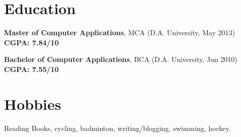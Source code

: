 \documentclass[overlapped,centered]{resume}
\begin{document}
\begin{resume}
    \section{\mysidestyle Education}

    \begin{list2}
	\item \textbf{Master of Computer Applications}, MCA (D.A. University, May 2013) \hspace{16mm} \textbf{CGPA: 7.84/10} 
	\end{list2}

	\begin{list2}
	\item \textbf{Bachelor of Computer Applications}, BCA (D.A. University, Jun 2010) \hspace{15mm} \textbf{CGPA: 7.55/10}
	\end{list2}

    \section{\mysidestyle Hobbies}
    \begin{list2}
    \item Reading Books, cycling, badminton, writing/blogging, swimming, hockey.
     
    \end{list2}

\end{resume}
\end{document}
